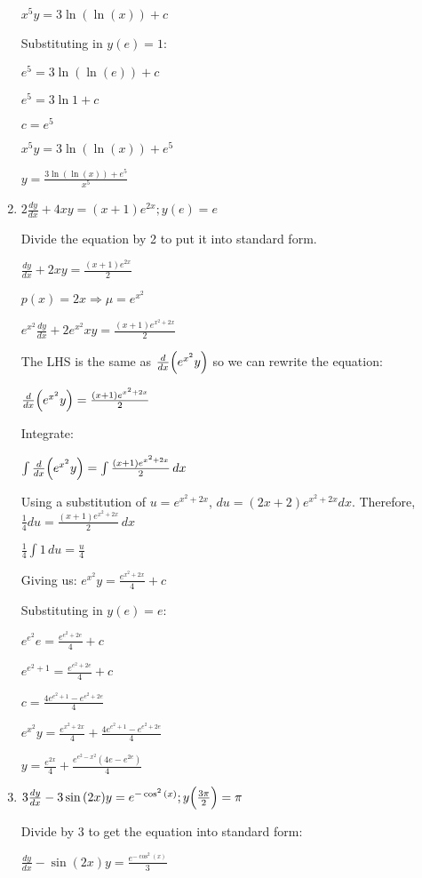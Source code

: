 \documentclass[../main.tex]{subfiles}
\begin{document}
\begin{enumerate}[itemsep=0.7cm]
    $x^5y=3\ln{(\ln{(x)})}+c$

    Substituting in $y(e)=1$:

    $e^5=3\ln{(\ln{(e)})}+c$

    $e^5=3\ln{1}+c$

    $c=e^5$

    $x^5y=3\ln{(\ln{(x)})}+e^5$

    $y=\frac{3\ln{(\ln{(x)})}+e^5}{x^5}$

    \item 
    $2\frac{dy}{dx}+4xy=(x+1)e^{2x}; y(e)=e$

    Divide the equation by 2 to put it into standard form.

    $\frac{dy}{dx}+2xy=\frac{(x+1)e^{2x}}{2}$

    $p(x)=2x \Rightarrow \mu=e^{x^2}$

    $e^{x^2}\frac{dy}{dx}+2e^{x^2}xy=\frac{(x+1)e^{x^2+2x}}{2}$

    The LHS is the same as $\frac{d}{dx}\Bigl(e^{x^2}y\Bigr)$ so we can rewrite the equation:

    $\frac{d}{dx}\Bigl(e^{x^2}y\Bigr)=\frac{(x+1)e^{x^2+2x}}{2}$

    Integrate:

    $\int \frac{d}{dx}\Bigl(e^{x^2}y\Bigr)=\int \frac{(x+1)e^{x^2+2x}}{2}\,dx$

    Using a substitution of $u=e^{x^2+2x}$, $du=(2x+2)e^{x^2+2x}dx$. Therefore, $\frac{1}{4}du=\frac{(x+1)e^{x^2+2x}}{2}\,dx$

    $\frac{1}{4}\int 1\,du=\frac{u}{4}$

    Giving us: $e^{x^2}y=\frac{e^{x^2+2x}}{4}+c$

    Substituting in $y(e)=e$:

    $e^{e^2}e=\frac{e^{e^2+2e}}{4}+c$

    $e^{e^2+1}=\frac{e^{e^2+2e}}{4}+c$

    $c=\frac{4e^{e^2+1}-e^{e^2+2e}}{4}$

    $e^{x^2}y=\frac{e^{x^2+2x}}{4}+\frac{4e^{e^2+1}-e^{e^2+2e}}{4}$

    $y=\frac{e^{2x}}{4}+\frac{e^{e^2-x^2}(4e-e^{2e})}{4}$

    \item 
    $3\frac{dy}{dx}-3\sin{(2x)}y=e^{-\cos^2{(x)}}; y\Bigl(\frac{3\pi}{2}\Bigr)=\pi$

    Divide by 3 to get the equation into standard form:

    $\frac{dy}{dx}-\sin{(2x)}y=\frac{e^{-\cos^2{(x)}}}{3}$


\end{enumerate}
\end{document}
